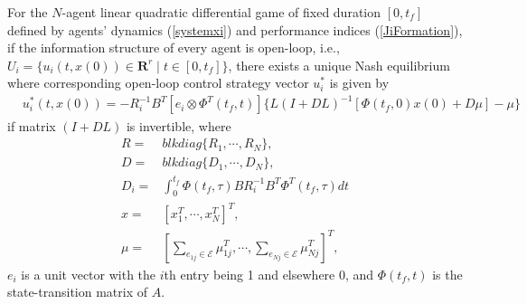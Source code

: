 \documentclass[12pt,draftcls,onecolumn]{IEEEtran}  %
\begin{document}
\begin{thm}
For the $N$-agent linear quadratic differential game of fixed duration $[0,t_f]$ defined by agents' dynamics (\ref{systemxi}) and performance indices (\ref{JiFormation}), if the information structure of every agent is open-loop, i.e., $U_i=\{u_i(t,x(0))\in \mathbf{R}^r \mid t\in[0,t_f]\}$, there exists a unique Nash equilibrium where corresponding open-loop control strategy vector $u^*_i$ is given by
\begin{align}
&u_i^*(t,x(0))=-R_i^{-1}B^T [e_i\otimes\Phi^T(t_f,t)] \{L(I+DL)^{-1}[\Phi(t_f,0)x(0)+D\mu]-\mu\}\label{uNash}
\end{align}
if matrix $(I+DL)$ is invertible, where
\begin{align}
R=&blkdiag\{R_1,\cdots,R_N\},\\
D=&blkdiag\{D_1,\cdots,D_N\}, \\
D_i=&\int^{t_f}_0\Phi(t_f,\tau)BR_i^{-1}B^T\Phi^T(t_f,\tau) dt
\label{Di} \\
x=&[x_1^T, \cdots, x_N^T]^T,\\
\mu=&\left[\sum_{e_{1j}\in{\mathcal{E}}}\mu^T_{1j},\cdots, \sum_{e_{Nj}\in{\mathcal{E}}}\mu^T_{Nj}\right]^T,
\end{align}
$e_i$ is a unit vector with the $i$th entry being 1 and elsewhere 0, and $\Phi(t_f,t)$ is the state-transition matrix of $A$.
\end{thm}
\end{document}
